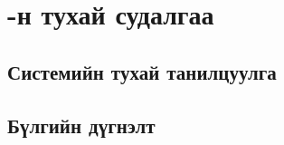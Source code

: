 


\newcommand{\keyword}[1]{\textbf{#1}}
\newcommand{\tabhead}[1]{\textbf{#1}}
\newcommand{\code}[1]{\texttt{#1}}
\newcommand{\file}[1]{\texttt{\bfseries#1}}
\newcommand{\option}[1]{\texttt{\itshape#1}}

\section{\ttitle-н тухай судалгаа}	
\subsection{Системийн тухай танилцуулга}
\subsection{Бүлгийн дүгнэлт}